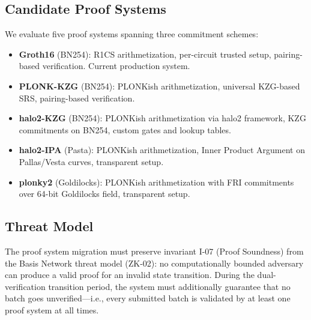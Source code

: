 \subsection{Candidate Proof Systems}

We evaluate five proof systems spanning three commitment
schemes:

\begin{itemize}
  \item \textbf{Groth16} (BN254): R1CS arithmetization, per-circuit
    trusted setup, pairing-based verification. Current production
    system.
  \item \textbf{PLONK-KZG} (BN254): PLONKish arithmetization,
    universal KZG-based SRS, pairing-based verification.
  \item \textbf{halo2-KZG} (BN254): PLONKish arithmetization via
    halo2 framework, KZG commitments on BN254, custom gates and
    lookup tables.
  \item \textbf{halo2-IPA} (Pasta): PLONKish arithmetization,
    Inner Product Argument on Pallas/Vesta curves, transparent setup.
  \item \textbf{plonky2} (Goldilocks): PLONKish arithmetization
    with FRI commitments over 64-bit Goldilocks field, transparent
    setup.
\end{itemize}

\subsection{Threat Model}

The proof system migration must preserve invariant I-07 (Proof
Soundness) from the Basis Network threat model (ZK-02): no
computationally bounded adversary can produce a valid proof for
an invalid state transition. During the dual-verification
transition period, the system must additionally guarantee that no
batch goes unverified---i.e., every submitted batch is validated
by at least one proof system at all times.
